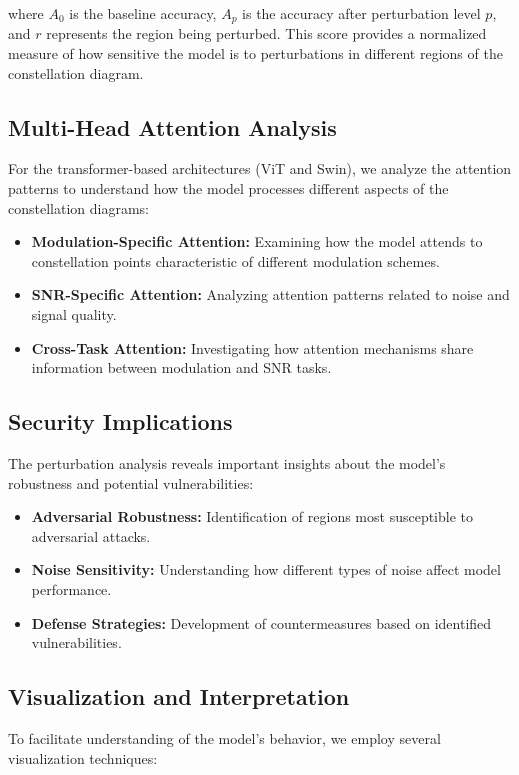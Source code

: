 \documentclass{ELSP}
\begin{document}
where $A_0$ is the baseline accuracy, $A_p$ is the accuracy after perturbation level $p$, and $r$ represents the region being perturbed. This score provides a normalized measure of how sensitive the model is to perturbations in different regions of the constellation diagram.

\subsection{Multi-Head Attention Analysis}
For the transformer-based architectures (ViT and Swin), we analyze the attention patterns to understand how the model processes different aspects of the constellation diagrams:

\begin{itemize}
    \item \textbf{Modulation-Specific Attention:} Examining how the model attends to constellation points characteristic of different modulation schemes.
    \item \textbf{SNR-Specific Attention:} Analyzing attention patterns related to noise and signal quality.
    \item \textbf{Cross-Task Attention:} Investigating how attention mechanisms share information between modulation and SNR tasks.
\end{itemize}

\subsection{Security Implications}
The perturbation analysis reveals important insights about the model's robustness and potential vulnerabilities:

\begin{itemize}
    \item \textbf{Adversarial Robustness:} Identification of regions most susceptible to adversarial attacks.
    \item \textbf{Noise Sensitivity:} Understanding how different types of noise affect model performance.
    \item \textbf{Defense Strategies:} Development of countermeasures based on identified vulnerabilities.
\end{itemize}

\subsection{Visualization and Interpretation}
To facilitate understanding of the model's behavior, we employ several visualization techniques:
\end{document}
